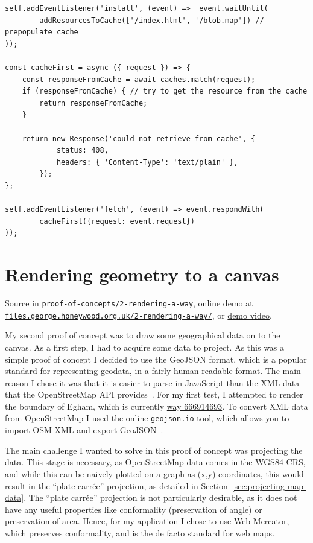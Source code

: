 \documentclass{final_report}
\begin{document}
\begin{lstlisting}[caption=Using the Service Worker cache]
self.addEventListener('install', (event) =>  event.waitUntil(
        addResourcesToCache(['/index.html', '/blob.map']) // prepopulate cache
));

const cacheFirst = async ({ request }) => {
    const responseFromCache = await caches.match(request);
    if (responseFromCache) { // try to get the resource from the cache
        return responseFromCache;
    }

    return new Response('could not retrieve from cache', {
            status: 408,
            headers: { 'Content-Type': 'text/plain' },
        });
};

self.addEventListener('fetch', (event) => event.respondWith(
        cacheFirst({request: event.request})
));
\end{lstlisting}

\section{Rendering geometry to a canvas}

{ \footnotesize Source in \texttt{proof-of-concepts/2-rendering-a-way}, online demo at \href{https://files.george.honeywood.org.uk/2-rendering-a-way/}{\nolinkurl{files.george.honeywood.org.uk/2-rendering-a-way/}}, or \href{https://youtu.be/2F_vpCrQsO4}{demo video}.}

My second proof of concept was to draw some geographical data on to the canvas. As a first step, I had to acquire some data to project. As this was a simple proof of concept I decided to use the GeoJSON format, which is a popular standard for representing geodata, in a fairly human-readable format. The main reason I chose it was that it is easier to parse in JavaScript than the XML data that the OpenStreetMap API provides~\cite{osm-api-wiki}. For my first test, I attempted to render the boundary of Egham, which is currently \href{https://www.openstreetmap.org/way/666914693}{way 666914693}. To convert XML data from OpenStreetMap I used the online \texttt{geojson.io} tool, which allows you to import OSM XML and export GeoJSON~\cite{geojson.io}.

The main challenge I wanted to solve in this proof of concept was projecting the data. This stage is necessary, as OpenStreetMap data comes in the WGS84 CRS, and while this can be naively plotted on a graph as (x,y) coordinates, this would result in the ``plate carrée'' projection, as detailed in Section~\ref{sec:projecting-map-data}. The ``plate carrée'' projection is not particularly desirable, as it does not have any useful properties like conformality (preservation of angle) or preservation of area. Hence, for my application I chose to use Web Mercator, which preserves conformality, and is the de facto standard for web maps.
\end{document}
